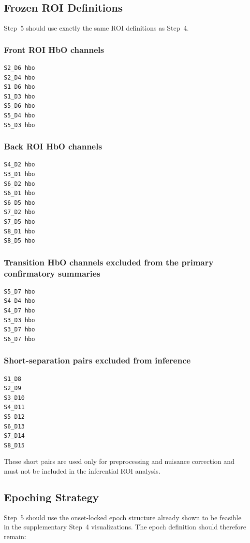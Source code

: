 \subsection{Frozen ROI Definitions}
Step~5 should use exactly the same ROI definitions as Step~4.

\subsubsection{Front ROI HbO channels}
\begin{verbatim}
S2_D6 hbo
S2_D4 hbo
S1_D6 hbo
S1_D3 hbo
S5_D6 hbo
S5_D4 hbo
S5_D3 hbo
\end{verbatim}

\subsubsection{Back ROI HbO channels}
\begin{verbatim}
S4_D2 hbo
S3_D1 hbo
S6_D2 hbo
S6_D1 hbo
S6_D5 hbo
S7_D2 hbo
S7_D5 hbo
S8_D1 hbo
S8_D5 hbo
\end{verbatim}

\subsubsection{Transition HbO channels excluded from the primary confirmatory summaries}
\begin{verbatim}
S5_D7 hbo
S4_D4 hbo
S4_D7 hbo
S3_D3 hbo
S3_D7 hbo
S6_D7 hbo
\end{verbatim}

\subsubsection{Short-separation pairs excluded from inference}
\begin{verbatim}
S1_D8
S2_D9
S3_D10
S4_D11
S5_D12
S6_D13
S7_D14
S8_D15
\end{verbatim}

These short pairs are used only for preprocessing and nuisance correction and must not be included
in the inferential ROI analysis.

\subsection{Epoching Strategy}
Step~5 should use the onset-locked epoch structure already shown to be feasible in the supplementary
Step~4 visualizations.
The epoch definition should therefore remain:

